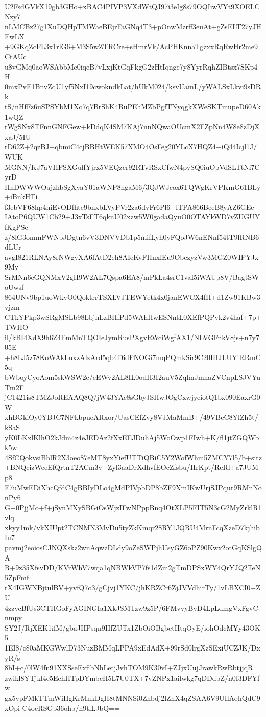U2FsdGVkX19gb3GHo+xBAC4PIVP3VXdWtQJ97i3eIg8s79OQIiwVYt9XOELCNzy7
nLMCBz27g1XuDQHpTMWaeBEjrFaGNq4T3+pOnwMzrff3euAt+gZsELT27yJHEwLX
+9GKqZcFL3x1rlG6+M3S5wZTRCre+sHmrVk/AcPHKnnaTgzxxRqRwHr2me9CtAUc
u8vGMq0aoWSAbbMe0iqeB7vLxjKtGqFkgG2zHtIqnge7y8YyrRqhZIBtsx7SKp4H
0mxPvE1BnvZqU1yf5NxI19cwokndkLat/hUkM024/ksvUamL/yWALSxLkvi9sDRk
tS/nHfFz6uSPSYbM1Xo7q7BrShK4BuPEhMZbPgfTNyqgkXWeSKTmupeD60Ak1wQZ
rWgSNx8TFnnGNFGew+kDdqK4SM7KAj7nnNQwaOUcmX2FZpNn4W8e8zDjXxaJ/5IU
rD62Z+2qzBJ+qbmiC4cjBBHtWEK57XMO4OsFeg20YLcX7HQZ4+iQ44Icjl1J/WUK
MGNN/KJ7aVHFSXGulfYjrx5VEQzcr92RTvRSxCfwN4pySQ0iuOpVdSLTtNi7CyrD
HnDWWWOajzhbSgXyaY01aWNP8hgaM6/3QJWJcox6TQWgKrVPKmG61BLy+iBnkHTi
f3ebVF68hp4niEvODfhte9bnxbLVyPVr2za6dvFr6Pl6+lTPA866BeeB8yAZ6GEe
IAtoP6QUW1Cb29+J3xTsFT6qknU02xzw5W0gadaQyuO0OTAYkWD7vZUGUYfKgPSe
z/8lG3ommFWNbJDgtn6vV3DNVVDb1p5mifLyh0yFQoJW6nENnf54tT9lRNB6dLUr
avgI821RLNAy8rNWgyXA6fAtD2eh8AIeKvFHnxlEu9ObezyzVw3MGZ0WIPYJx9My
SrMNn6cGQNMxV2gH9W2AL7Qspa6EA8/mPkLa4srC1vaI5iWAUp8V/BagtSWoUwsf
864UNv9bp1uoWkvO0QoktrrTSXLVJTEWYetk4x0janEWCX4fH+d1Zw91KBw3vjzm
CTkYPkp3wSRgMSLb98LbjnLzBHfPd5WAhHwESNntL0XEfPQPvk2v4haf+7p+TWHO
il/kBI4XdX9h6Z4EmMnTQOIeJymRusPXgvRWciWgfAX1/NLVGFnkV8js+n7y705E
+h8LJ5z78KoWAkLuxzAlzArd5qb4ff6dFNOGi7mqPQmkSir9C20IHJLUYiRRmC5q
bWboyCyoAom5skWSW2e/eEWv2AL8IL0odH3I2auV5ZqlmJmnaZVCnpLSJVYuTm2F
jC1421is8TMZJoREAAQ8Q/jW43YAc8sGbyJSHwJOgCxwjyeiotQ1bx090EaxrG0W
xhBGkiOy0YBJC7NFkbpueARxor/UasCEfZvy8VJMaMmB+/49VBcC8YlZh5t/kSaS
yK0LKxlKlhO2kJdm4z4eJEDAz2fXxEEJDuhAj5WoOwp1FIwh+K/fl1jtZGQWbk5w
4SfCQokvsiBhlR2X3oeo87eMT8yxYiefUTTiQBiC5Y2WofWhm5ZMCY7l5/b+sitz
+BNQcizWeeEfQrtnT2ACm3v+Zyl3aaDrXdhvfEOcZfsbu/HrKpt/ReRl+a7JUMp8
F7uMwEDiXhcQfdC4gBBIyDLo4gMdPIVpbDP8bZF9XmIKwUrjSJPqur9RMnNonPy6
G+0PjjMo+f+jSynMXySBGiOsWjzIFwNPppBnq4OtXLP5FIT5N3cG2MyZrklR1vlq
xkyy1mk/vkXIUpt2TCNMN3MvDu5tyZkKmqr28RY1JQRU4MrnFcqXzeD7kjhibIu7
pavmj2eoiosCJNQXskz2wnAqwzDLdy9oZeSWPjhUsyGZ6oPZ90Kwx2otGqKSlgQA
R+9z35XfsvDD/KVrWhV7wqa1qNBWkVP7fs1dZm2gTmDPSxWY4QrYJQ2TeN5ZpFmf
rX4IGWNBjtulBV+yvfQ7o3/gCjvj1YKC/jhKRZCr6ZjJVVdhirTy/1vLBXCI0+ZU
4zzvcBfUs3CTHGoFyAGINGIa1XkJSMTzw9z5P/6FMvvyByD4LpLdmgVxFgvCnmpy
SY2J/RjXEK1ifM/gbaJHPsqn9IIfZUTx1ZbOiOBgbctHtqOyE/iohOdcMYy43OK5
1EI8/c80aMKGWwlD73NuzBMMqLPPA9xEdAdX+99rSd0lrgXzSExiUCZJK/DxyR/s
8bI+c/0lW4fn91XXSseExflbNhLetjJvhTOM9K30vI+ZJjxUujJrawkRwRbtjjqR
zwikl8YTjkl4e5EehHTpDYmbeH5L7U0TX+7vZNPx1ailwkg7qDDdbZ/n0I3DFYfw
gx5vpFMkTTmWiHgKrMnkDgH8tMNNSi0Znbdj2lZhX4qZSAA6V9UIlAqhQdC9xOpi
C4ocRSGb36ohb/n9tlLJbQ==
